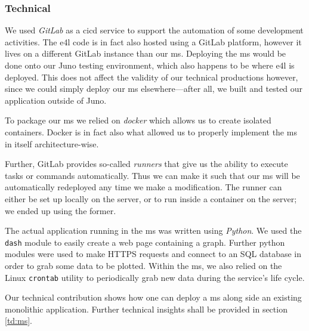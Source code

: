 \subsubsection{Technical}

We used \textit{GitLab} as a \gls{cicd} service to support the
automation of some development activities. The \gls{e4l}
code is in fact also hosted using a GitLab platform, however it lives
on a different GitLab instance than our \gls{ms}. Deploying the
\gls{ms} would be done onto our Juno testing environment, which also
happens to be where \gls{e4l} is deployed. This does not affect the
validity of our technical productions however, since we could simply
deploy our \gls{ms} elsewhere---after all, we built and tested our
application outside of Juno.

To package our \gls{ms} we relied on \textit{docker} which allows us to create
isolated containers. Docker is in fact also what allowed us to
properly implement the \gls{ms} in itself architecture-wise.

Further, GitLab provides so-called \textit{runners} that give us the
ability to execute tasks or commands automatically. Thus we can make
it such that our \gls{ms} will be automatically redeployed any time we
make a modification. The runner can either be set up locally on the
server, or to run inside a container on the server; we ended up using
the former.

The actual application running in the \gls{ms} was written using
\textit{Python}. We used the \verb|dash| module to easily create a web page
containing a graph. Further python modules were used to make HTTPS
requests and connect to an SQL database in order to grab some data to
be plotted.  Within the \gls{ms}, we also relied on the Linux
\verb|crontab| utility to periodically grab new data during the
service's life cycle. 

Our technical contribution shows how one can deploy a \gls{ms} along
side an existing monolithic application. Further technical insights
shall be provided in section \ref{td:ms}.

